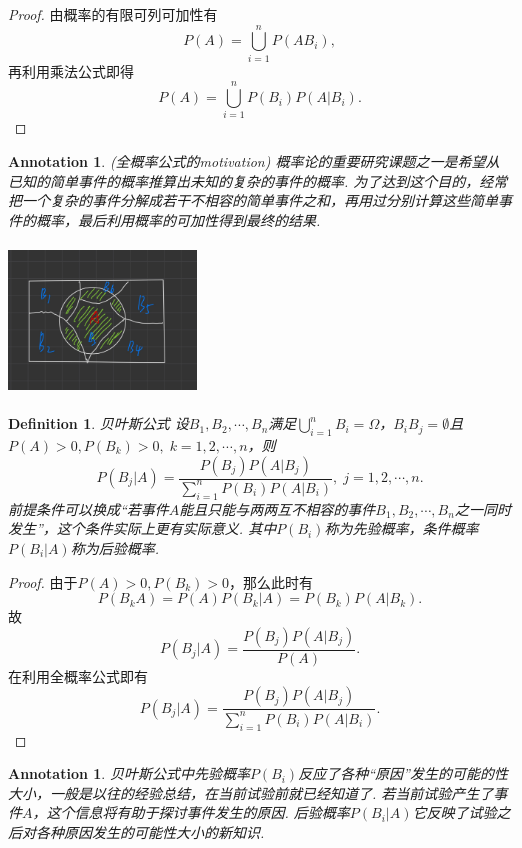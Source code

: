 \documentclass{article}
\newtheorem{definition}[theorem]{Definition}
\newtheorem{annotation}[theorem]{Annotation}
\begin{document}
\begin{proof}
由概率的有限可列可加性有
$$
P(A) = \bigcup\limits_{i=1}^n P(AB_i),
$$
再利用乘法公式即得
$$
P(A) = \bigcup\limits_{i=1}^n P(B_i)P(A|B_i).
$$
\end{proof}

\begin{annotation}
\rm {\color{red}(全概率公式的motivation)} 概率论的重要研究课题之一是希望从已知的简单事件的概率推算出未知的复杂的事件的概率. 为了达到这个目的，经常把一个复杂的事件分解成若干不相容的简单事件之和，再用过分别计算这些简单事件的概率，最后利用概率的可加性得到最终的结果.

\begin{center}
\includegraphics[width=5cm, height=4cm]{images/total_probability.jpg}
\end{center}
\end{annotation}

\begin{definition}
\rm {\color{red}贝叶斯公式} 设$B_1,B_2,\cdots,B_n$满足$\bigcup\limits_{i=1}^n B_i = \Omega$，$B_iB_j = \emptyset$且$P(A)>0, P(B_k) > 0,\; k=1,2,\cdots,n$，则
	$$
		P(B_j | A) = \frac{P(B_j)P(A|B_j)}{\sum\limits_{i=1}^n P(B_i)P(A|B_i)},\; j = 1,2,\cdots,n.
	$$
前提条件可以换成“若事件$A$能且只能与两两互不相容的事件$B_1,B_2,\cdots,B_n$之一同时发生”，这个条件实际上更有实际意义. 其中$P(B_i)$称为先验概率，条件概率$P(B_i | A)$称为后验概率. 
\end{definition}

\begin{proof}
由于$P(A) > 0,P(B_k) > 0$，那么此时有
$$
P(B_kA) = P(A)P(B_k|A) = P(B_k)P(A|B_k). 
$$
故
$$
P(B_j|A) = \frac{P(B_j)P(A|B_j)}{P(A)}.
$$
在利用全概率公式即有
$$
P(B_j|A) = \frac{P(B_j)P(A|B_j)}{\sum\limits_{i =1}^n P(B_i)P(A|B_i)}.
$$
\end{proof}

\begin{annotation}
\rm 贝叶斯公式中先验概率$P(B_i)$反应了各种“原因”发生的可能的性大小，一般是以往的经验总结，在当前试验前就已经知道了. 若当前试验产生了事件$A$，这个信息将有助于探讨事件发生的原因. 后验概率$P(B_i|A)$它反映了试验之后对各种原因发生的可能性大小的新知识.
\end{annotation}
\end{document}
